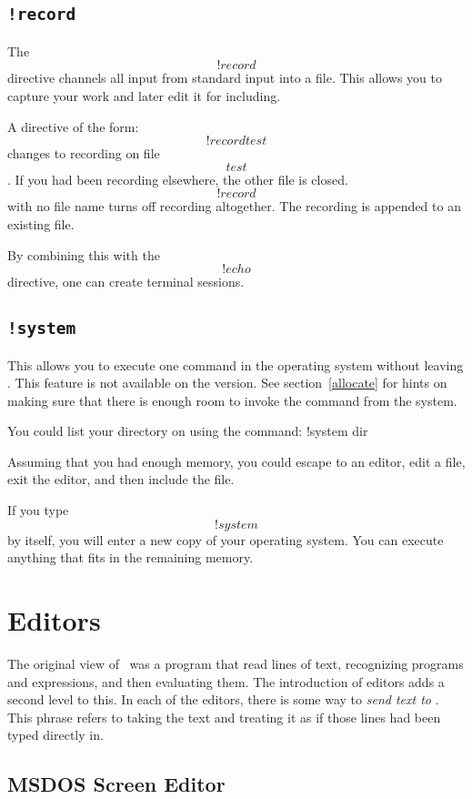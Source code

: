 {\pagebreak[0]
\subsection{{\tt !record}}

    The \[!record\] directive channels all input from standard input
    into a file.
    This allows you to capture your work and later edit it for
    including.

    A directive of the form: \[!record test\] changes to recording on
    file \[test\].
    If you had been recording elsewhere, the other file is closed.
    \[!record\] with no file name turns off recording altogether.
    The recording is appended to an existing file.

    By combining this with the \[!echo\] directive, one can create
    terminal sessions.


\pagebreak[0]
\subsection{{\tt !system}}
    This allows you to execute one command in the operating system
    without leaving \ISETL{}\@.
    This feature is not available on the  version.
    See section~\ref{allocate} for hints on making sure that there is
    enough room to invoke the command from the system.

    You could list your directory on  using the command:
    \nopagebreak
    \DS
	!system dir
    \DE

    Assuming that you had enough memory, you could escape to an
    editor, edit a file, exit the editor, and then include the file.

    If you type \[!system\] by itself, you will enter a new copy of
    your operating system.
    You can execute anything that fits in the remaining memory.

\section{Editors}
The original view of \ISETL\ was a program that read lines of text,
recognizing programs and expressions, and then evaluating them.
The introduction of editors adds a second level to this.
In each of the editors, there is some way to {\em send text to \ISETL}.
This phrase refers to taking the text and treating it as if those
lines had been typed directly in.

\subsection{MSDOS Screen Editor}

}
